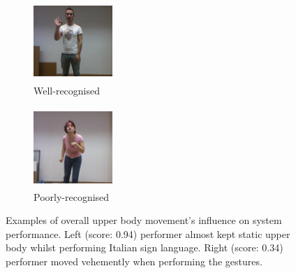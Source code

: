 \begin{figure}[t]
        \centering


        \begin{subfigure}[c]{.2\textwidth}
        \centering
                \includegraphics[width=3cm,height=3cm, trim=120 100 100 50, clip]{images/good}
                \caption{Well-recognised}
        \end{subfigure}%
        \begin{subfigure}[c]{0.2\textwidth}
        \centering
                \includegraphics[width=3cm,height=3cm, trim=120 100 100 50, clip]{images/bad}
                \caption{Poorly-recognised}
        \end{subfigure}
  \caption{
  Examples of overall upper body movement's influence on system performance. Left (score: 0.94) performer almost kept static upper body whilst performing Italian sign language. Right (score: 0.34) performer moved vehemently when performing the gestures.
  }\label{good_bad_differ}
\end{figure}



